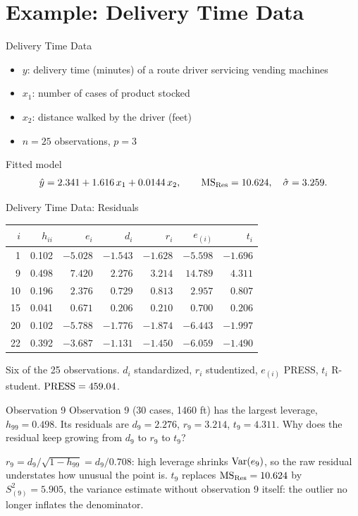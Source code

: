 \section{Example: Delivery Time Data}


\begin{frame}{Delivery Time Data}
    \begin{itemize}
        \item $y$: delivery time (minutes) of a route driver servicing vending machines
        \item $x_1$: number of cases of product stocked
        \item $x_2$: distance walked by the driver (feet)
        \item $n=25$ observations, $p=3$
    \end{itemize}
    Fitted model
    \[
        \hat y = 2.341 + 1.616\,x_1 + 0.0144\,x_2, \qquad \mathrm{MS}_{\mathrm{Res}}=10.624, \quad \hat\sigma=3.259 .
    \]
\end{frame}


\begin{frame}{Delivery Time Data: Residuals}
    \begin{center}
        \begin{tabular}{rrrrrrr}
            \toprule
            $i$ & $h_{ii}$ & $e_i$ & $d_i$ & $r_i$ & $e_{(i)}$ & $t_i$ \\
            \midrule
            1 & 0.102 & $-5.028$ & $-1.543$ & $-1.628$ & $-5.598$ & $-1.696$ \\
            9 & 0.498 & $7.420$ & $2.276$ & $3.214$ & $14.789$ & $4.311$ \\
            10 & 0.196 & $2.376$ & $0.729$ & $0.813$ & $2.957$ & $0.807$ \\
            15 & 0.041 & $0.671$ & $0.206$ & $0.210$ & $0.700$ & $0.206$ \\
            20 & 0.102 & $-5.788$ & $-1.776$ & $-1.874$ & $-6.443$ & $-1.997$ \\
            22 & 0.392 & $-3.687$ & $-1.131$ & $-1.450$ & $-6.059$ & $-1.490$ \\
            \bottomrule
        \end{tabular}
    \end{center}
    Six of the 25 observations. $d_i$ standardized, $r_i$ studentized, $e_{(i)}$ PRESS, $t_i$ R-student. $\mathrm{PRESS}=459.04$.
\end{frame}


\begin{frame}{Observation 9}
    Observation 9 (30 cases, 1460 ft) has the largest leverage, $h_{99}=0.498$. Its residuals are $d_9=2.276$, $r_9=3.214$, $t_9=4.311$. Why does the residual keep growing from $d_9$ to $r_9$ to $t_9$?

    \pause

    \svspace{1em}

    $r_9=d_9/\sqrt{1-h_{99}}=d_9/0.708$: high leverage shrinks $\operatorname{Var}(e_9)$, so the raw residual understates how unusual the point is. $t_9$ replaces $\mathrm{MS}_{\mathrm{Res}}=10.624$ by $S_{(9)}^2=5.905$, the variance estimate without observation 9 itself: the outlier no longer inflates the denominator.
\end{frame}


